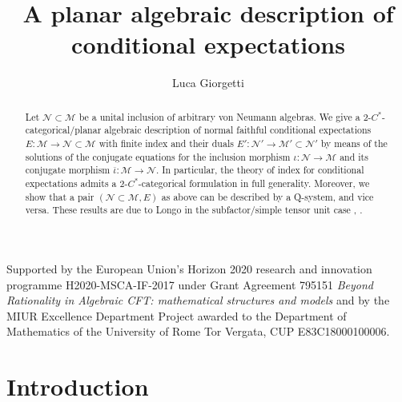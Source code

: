 \documentclass[11pt,a4paper]{article}
\makeatletter
\newcommand{\iotabar}{{\overline{\iota}}}
\newcommand{\M}{\mathcal{M}}
\newcommand{\N}{\mathcal{N}}
\DeclareRobustCommand{\Thm}{Thm.\@\xspace}
\newcommand{\Cstar}{$C^\ast$\@\xspace}
\theoremstyle{plain}
\theoremstyle{definition}
\theoremstyle{remark}
\numberwithin{equation}{section}%
\makeatother
\begin{document}
\title{\LARGE A planar algebraic description of conditional expectations}

\author{\Large Luca Giorgetti}


\date{}

\maketitle

\begin{abstract}
Let $\N\subset\M$ be a unital inclusion of arbitrary von Neumann algebras. We give a 2-\Cstar-categorical/planar algebraic description of normal faithful conditional expectations $E:\M\to\N\subset\M$ with finite index and their duals $E':\N'\to\M'\subset\N'$ by means of the solutions of the conjugate equations for the inclusion morphism $\iota:\N\to\M$ and its conjugate morphism $\iotabar:\M\to\N$. In particular, the theory of index for conditional expectations admits a 2-\Cstar-categorical formulation in full generality. Moreover, we show that a pair $(\N\subset\M, E)$ as above can be described by a Q-system, and vice versa.
These results are due to Longo in the subfactor/simple tensor unit case \cite[\Thm 5.2]{Lon90}, \cite[\Thm 5.1]{Lon94}.
\end{abstract}

\tableofcontents

\vfill

{\footnotesize Supported by the European Union's Horizon 2020 research and innovation programme H2020-MSCA-IF-2017 under Grant Agreement 795151 \emph{Beyond Rationality in Algebraic CFT: mathematical structures and models} and by the MIUR Excellence Department Project awarded to the Department of Mathematics of the University of Rome Tor Vergata, CUP E83C18000100006.}

\newpage


\section{Introduction}
\end{document}
